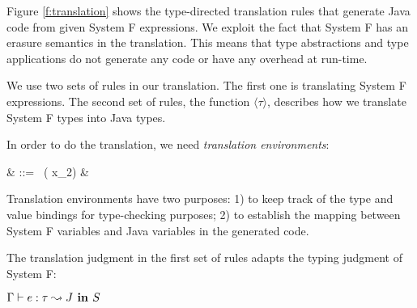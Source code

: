 Figure \ref{f:translation} shows the type-directed translation rules
that generate Java code from given System F expressions. We exploit
the fact that System F has an erasure semantics in the
translation. This means that type abstractions and type applications
do not generate any code or have any overhead at run-time.

We use two sets of rules in our translation. The first one
is translating System F expressions. The second set of rules,
 the function $\langle \tau\rangle$, describes 
 how we translate System F types into Java types.

In order to do the translation, we need \emph{translation environments}:

\hspace{-7pt} & \Gamma ::=
\epsilon \mid \Gamma~( \mapsto x_2) \mid \Gamma \alpha & \\ \eda

\noindent Translation environments have two purposes: 1) to keep track of the type 
and value bindings for type-checking purposes; 2) to establish the mapping 
between System F variables and Java variables in the generated code.


The translation judgment in the first set of rules adapts the typing
judgment of System F:

$\Gamma \vdash  e : \tau \leadsto J \textbf{~in~} S$

